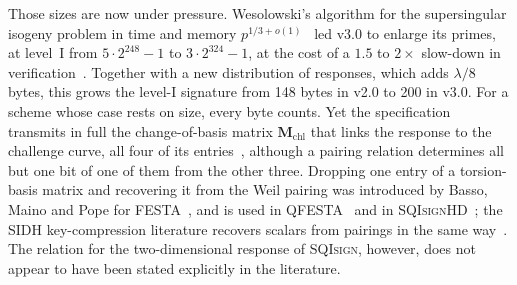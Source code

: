 \documentclass[version=submission]{iacrcc}
\newcommand{\Mm}{\mathbf{M}}
\newcommand{\SQIsign}{{SQI}\textsc{sign}}
\begin{document}
Those sizes are now under pressure. Wesolowski's algorithm for the
supersingular isogeny problem in time and memory $p^{1/3 + o(1)}$~\cite{wes26} led v3.0 to enlarge its primes, at level~I from $5 \cdot 2^{248} - 1$ to $3 \cdot 2^{324} - 1$, at the cost of a $1.5$ to $2\times$ slow-down in
verification~\cite[Section~1.4]{sqisign-spec-r3}.
Together with a new distribution of responses, which adds $\lambda / 8$ bytes, this grows the level-I signature from 148 bytes in v2.0 to 200 in v3.0.
For a scheme whose case rests on size, every byte counts.
Yet the specification transmits in full the change-of-basis matrix $\Mm_{\mathrm{chl}}$ that links the response to the challenge curve, all four of its entries~\cite[Chapter~6]{sqisign-spec-r3}, although a pairing relation determines all but one bit of one of them from the other three.
Dropping one entry of a torsion-basis matrix and recovering it from the Weil pairing was introduced by Basso, Maino and Pope for FESTA~\cite{festa}, and is used in QFESTA~\cite{qfesta} and in {\SQIsign}HD~\cite{sqisignhd}; the SIDH key-compression literature recovers scalars from pairings in the same way~\cite{costello-compression,zanon2018,pereira-barreto}.
The relation for the two-dimensional response of {\SQIsign}, however, does not appear to have been stated explicitly in the literature.

\end{document}
